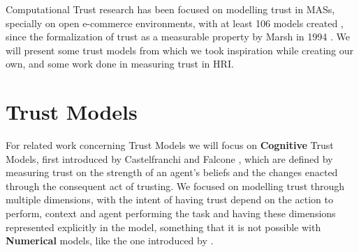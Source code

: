 \label{chap:RelatedWork}

Computational Trust research has been focused on modelling trust in \acp{MAS}, specially on open e-commerce environments\cite{Granatyr2015, HanYu2013, Pinyol2013, Noorian2010, Huang2008}, with at least 106 models created \cite{Granatyr2015}, since the formalization of trust as a measurable property by Marsh in 1994 \cite{Marsh1994}. We will present some trust models from which we took inspiration while creating our own, and some work done in measuring trust in \ac{HRI}.

\section{Trust Models}
\label{sec:Related work:Trust Models}
For related work concerning Trust Models we will focus on \textbf{Cognitive} Trust Models, first introduced by Castelfranchi and Falcone \cite{Castelfranchi1998}, which are defined by measuring trust on the strength of an agent's beliefs and the changes enacted through the consequent act of trusting. We focused on modelling trust through multiple dimensions, with the intent of having trust depend on the action to perform, context and agent performing the task and having these dimensions represented explicitly in the model, something that it is not possible with \textbf{Numerical} models, like the one introduced by \cite{Marsh1994}. 


